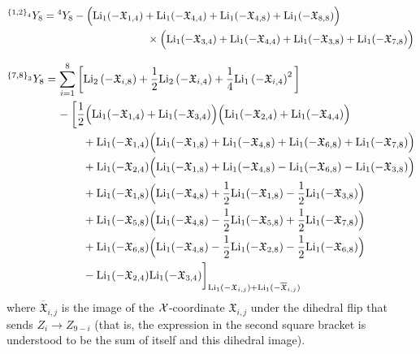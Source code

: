 \documentclass[11pt]{article}
\def\LiOneCalX#1#2{\text{Li}_1(-\mathfrak{X}_{#1,#2})}
\def\LiOneBarCalX#1#2{\text{Li}_1(-\overline{\mathfrak{X}}_{#1,#2})}
\begin{document}
 \begin{align}
{}^{{\{1,2\}}_4} Y_{8} &= {}^{4}Y_8 -
\Big( \LiOneCalX{1}{4} + \LiOneCalX{4}{4} + \LiOneCalX{4}{8} + \LiOneCalX{8}{8} \Big)  \\
&\hspace{3.4cm} \times \Big( \LiOneCalX{3}{4}+ \LiOneCalX{4}{4} + \LiOneCalX{3}{8} + \LiOneCalX{7}{8} \Big) \nonumber
\end{align}

 \begin{align}
{}^{{\{7,8\}}_3} Y_{8} &= \sum_{i=1}^8 \bigg[ \text{Li}_2 \left( - \mathfrak{X}_{i,8} \right) + \frac12 \text{Li}_2 \left(- \mathfrak{X}_{i,4}  \right) + \frac14 \text{Li}_1\left(- \mathfrak{X}_{i,4} \right)^2 \bigg] \nonumber \\
&\hspace{.4cm}- \bigg[ \frac 12\Big( \LiOneCalX{1}{4} + \LiOneCalX{3}{4} \Big) \Big( \LiOneCalX{2}{4} + \LiOneCalX{4}{4} \Big)  \nonumber \\
&\hspace{1.2cm} + \LiOneCalX{1}{4}  \Big( \LiOneCalX{1}{8} + \LiOneCalX{4}{8} + \LiOneCalX{6}{8} + \LiOneCalX{7}{8} \Big) \nonumber \\ 
&\hspace{1.2cm} + \LiOneCalX{2}{4}  \Big( \LiOneCalX{1}{8} + \LiOneCalX{4}{8} - \LiOneCalX{6}{8}  -  \LiOneCalX{3}{8} \Big) \\
&\hspace{1.2cm} + \LiOneCalX{1}{8}  \Big( \LiOneCalX{4}{8} + \frac12  \LiOneCalX{1}{8} - \frac12 \LiOneCalX{3}{8} \Big) \nonumber \\
&\hspace{1.2cm} + \LiOneCalX{5}{8}  \Big( \LiOneCalX{4}{8} - \frac12  \LiOneCalX{5}{8} + \frac12 \LiOneCalX{7}{8} \Big) \nonumber \\
&\hspace{1.2cm} + \LiOneCalX{6}{8}  \Big( \LiOneCalX{4}{8} - \frac12  \LiOneCalX{2}{8} - \frac12 \LiOneCalX{6}{8} \Big)\nonumber \\
&\hspace{1.2cm} - \LiOneCalX{2}{4} \LiOneCalX{3}{4} \bigg]_{\LiOneCalX{i}{j} + \LiOneBarCalX{i}{j}} \nonumber
\end{align}
where $\overline{\mathfrak{X}}_{i,j}$ is the image of the ${\cal X}$-coordinate $\mathfrak{X}_{i,j}$ under the dihedral flip that sends $Z_i \rightarrow Z_{9-i}$ (that is, the expression in the second square bracket is understood to be the sum of itself and this dihedral image). 
\end{document}
